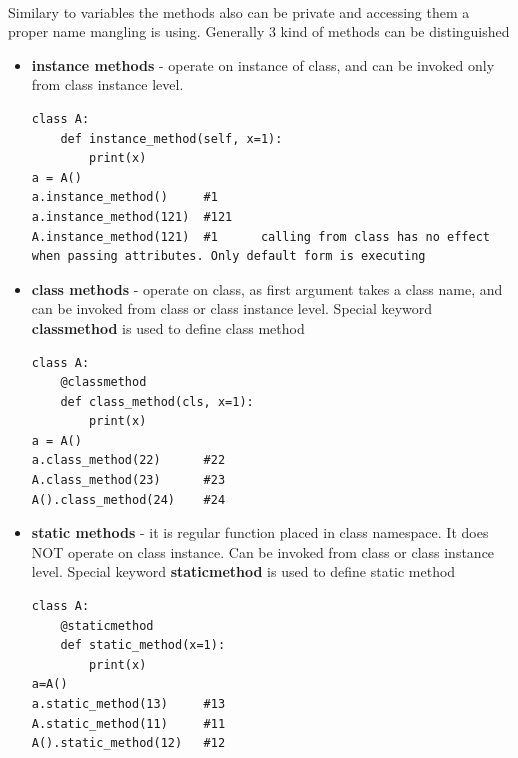 \documentclass{article}
\begin{document}
\paragraph{}
Similary to variables the methods also can be private and accessing them a proper name mangling is using. Generally 3 kind of methods can be distinguished
\begin{itemize}
\item \textbf{instance methods} - operate on instance of class, and can be invoked only from class instance level.
\begin{lstlisting}[style=pystyle]
class A:
	def instance_method(self, x=1):
		print(x)
a = A()
a.instance_method()		#1
a.instance_method(121)	#121
A.instance_method(121)	#1		calling from class has no effect when passing attributes. Only default form is executing
\end{lstlisting}
\item \textbf{class methods} - operate on class, as first argument takes a class name, and can be invoked from class or class instance level. Special keyword \textbf{classmethod} is used to define class method
\begin{lstlisting}[style=pystyle]
class A:
	@classmethod
	def class_method(cls, x=1):
		print(x)
a = A()
a.class_method(22)		#22
A.class_method(23)		#23
A().class_method(24)	#24
\end{lstlisting}
\item \textbf{static methods} - it is regular function placed in class namespace. It does NOT operate on class instance. Can be invoked from class or class instance level. Special keyword \textbf{staticmethod} is used to define static method
\begin{lstlisting}[style=pystyle]
class A:
	@staticmethod
	def static_method(x=1):
		print(x)
a=A()
a.static_method(13)		#13
A.static_method(11)		#11
A().static_method(12)	#12
\end{lstlisting}
\end{itemize}
\end{document}
